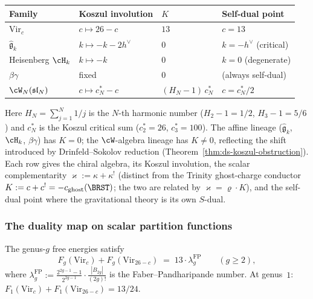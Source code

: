 \begin{center}
\small
\renewcommand{\arraystretch}{1.15}
\begin{tabular}{llll}
\textbf{Family} & \textbf{Koszul involution}
 & $K$ & \textbf{Self-dual point} \\
\hline
$\mathrm{Vir}_c$ & $c \mapsto 26-c$ & $13$ & $c = 13$ \\[2pt]
$\hat{\mathfrak{g}}_k$ & $k \mapsto -k-2h^\vee$ &
 $0$ & $k = -h^\vee$ (critical) \\[2pt]
Heisenberg $\cH_k$ & $k \mapsto -k$ & $0$ &
 $k = 0$ (degenerate) \\[2pt]
$\beta\gamma$ & fixed & $0$ & (always self-dual) \\[2pt]
$\cW_N(\mathfrak{sl}_N)$ &
 $c \mapsto c^*_N - c$ & $(H_N{-}1)\,c^*_N$ &
 $c = c^*_N/2$
\end{tabular}
\end{center}

Here $H_N = \sum_{j=1}^N 1/j$ is the $N$-th harmonic number
($H_2 - 1 = 1/2$, $H_3 - 1 = 5/6$) and
$c^*_N$ is the Koszul critical sum
($c^*_2 = 26$, $c^*_3 = 100$).
The affine lineage ($\hat{\mathfrak{g}}_k$, $\cH_k$, $\beta\gamma$)
has $K = 0$; the $\cW$-algebra lineage has $K \neq 0$, reflecting the
shift introduced by Drinfeld--Sokolov reduction (Theorem~\ref{thm:ds-koszul-obstruction}).
Each row gives the chiral algebra, its Koszul involution, the scalar
complementarity $\varkappa := \kappa + \kappa^!$ (distinct from the Trinity
ghost-charge conductor $K := c + c^! = -c_{\mathrm{ghost}}(\BRST)$; the
two are related by $\varkappa = \varrho\cdot K$), and the self-dual
point where the gravitational theory is its own $S$-dual.

\subsubsection*{The duality map on scalar partition functions}

\begin{proposition}
\label{prop:gravity-genus-tower-duality}
The genus-$g$ free energies satisfy
\begin{equation}\label{eq:genus-tower-duality}
F_g(\mathrm{Vir}_c) + F_g(\mathrm{Vir}_{26-c})
\;=\;
13 \cdot \lambda_g^{\mathrm{FP}}
\qquad
(g \ge 2),
\end{equation}
where $\lambda_g^{\mathrm{FP}}
:= \frac{2^{2g-1}-1}{2^{2g-1}} \cdot \frac{|B_{2g}|}{(2g)!}$
is the Faber--Pandharipande number.
At genus~$1$:
$F_1(\mathrm{Vir}_c) + F_1(\mathrm{Vir}_{26-c})
= 13/24$.
\end{proposition}

